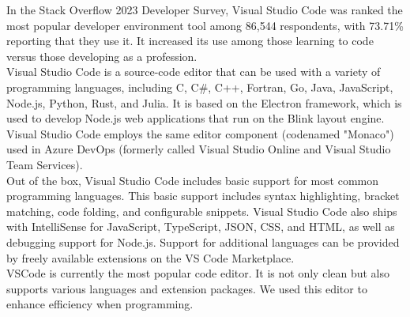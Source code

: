 In the Stack Overflow 2023 Developer Survey, Visual Studio Code was ranked the most popular developer environment tool among 86,544 respondents, with 73.71\% reporting that they use it. It increased its use among those learning to code versus those developing as a profession.
\\

Visual Studio Code is a source-code editor that can be used with a variety of programming languages, including C, C\#, C++, Fortran, Go, Java, JavaScript, Node.js, Python, Rust, and Julia. It is based on the Electron framework, which is used to develop Node.js web applications that run on the Blink layout engine. Visual Studio Code employs the same editor component (codenamed "Monaco") used in Azure DevOps (formerly called Visual Studio Online and Visual Studio Team Services).
\\

Out of the box, Visual Studio Code includes basic support for most common programming languages. This basic support includes syntax highlighting, bracket matching, code folding, and configurable snippets. Visual Studio Code also ships with IntelliSense for JavaScript, TypeScript, JSON, CSS, and HTML, as well as debugging support for Node.js. Support for additional languages can be provided by freely available extensions on the VS Code Marketplace. 
\\

VSCode is currently the most popular code editor. It is not only clean but also supports various languages and extension packages. We used this editor to enhance efficiency when programming.\\

